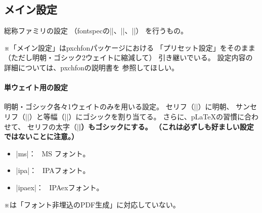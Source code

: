\documentclass[a4paper]{bxjsarticle}
\newcommand{\Pkg}[1]{\textsf{#1}}
\newcommand{\Note}{\par\noindent ※}
\newcommand{\Means}{：\ }
\providecommand{\pLaTeX}{p\LaTeX}
\begin{document}
\subsection{メイン設定}

総称ファミリの設定
（\Pkg{fontspec}の|\setmainfont|、|\setsansfont|、|\setmonofont|）
を行うもの。

\Note 「メイン設定」は\Pkg{pxchfon}パッケージにおける
「プリセット設定」をそのまま
（ただし明朝・ゴシック2ウェイトに縮減して）
引き継いでいる。
設定内容の詳細については、\Pkg{pxchfon}の説明書を
参照してほしい。

\paragraph{単ウェイト用の設定}
明朝・ゴシック各々1ウェイトのみを用いる設定。
セリフ（|\rmfamily|）に明朝、
サンセリフ（|\sffamily|）と等幅（|\ttfamily|）にゴシックを割り当てる。
さらに、{\pLaTeX}\>の習慣に合わせて、
セリフの太字（|\bfseries|）もゴシックにする。
（これは必ずしも好ましい設定ではないことに注意。）

\begin{itemize}
\item |ms|\Means
MS フォント。
\item |ipa|\Means
IPAフォント。
\item |ipaex|\Means
IPAexフォント。
\end{itemize}
\Note {\XeTeX}\>は「フォント非埋込のPDF生成」に対応していない。
\end{document}

